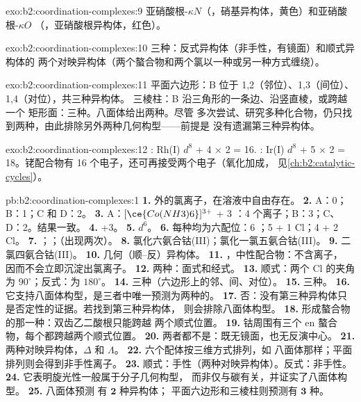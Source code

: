 \begin{solution}{exo:b2:coordination-complexes:9}
亚硝酸根-$\kappa N$（，硝基异构体，黄色）和亚硝酸根-$\kappa O$
（，亚硝酸根异构体，红色）。
\end{solution}

\begin{solution}{exo:b2:coordination-complexes:10}
三种：反式异构体（非手性，有镜面）和顺式异构体的
两个对映异构体（两个螯合物和两个氯以一种或另一种方式缠绕）。
\end{solution}

\begin{solution}{exo:b2:coordination-complexes:11}
平面六边形：B 位于 1,2（邻位）、1,3（间位）、1,4（对位），共三种异构体。
三棱柱：B 沿三角形的一条边、沿竖直棱，或跨越一个
矩形面：三种。八面体给出两种。尽管
多次尝试、研究多种化合物，仍只找到两种，由此排除另外两种几何构型——前提是
没有遗漏第三种异构体。
\end{solution}

\begin{solution}{exo:b2:coordination-complexes:12}
: Rh(I) $d^8$ + 4 × 2 = 16. : Ir(I) $d^8$ + 5 × 2 =
18。铑配合物有 16 个电子，还可再接受两个电子（氧化加成，
见\cref{ch:b2:catalytic-cycles}）。
\end{solution}

\begin{solution}{pb:b2:coordination-complexes:1}
\textbf{1.} 外的氯离子，在溶液中自由存在。
\textbf{2.} A：0；B：1；C 和 D：2。
\textbf{3.} A：$[\ce{Co(NH3)6}]^{3+}$ + 3 ：4 个离子；B：3；C、D：2。结果一致。
\textbf{4.} +3。
\textbf{5.} $d^6$。
\textbf{6.} 每种均为六配位：6 ；5  + 1 Cl；4  + 2 Cl。
\textbf{7.} ；；（出现两次）。
\textbf{8.} 氯化六氨合钴(III)；氯化一氯五氨合钴(III)。
\textbf{9.} 二氯四氨合钴(III)。
\textbf{10.} 几何（顺–反）异构体。
\textbf{11.} \ce{[CoCl3(NH3)3]}，中性配合物：不含离子，
因而不会立即沉淀出氯离子。
\textbf{12.} 两种：面式和经式。
\textbf{13.} 顺式：两个 Cl 的夹角为 $90^\circ$；反式：为 $180^\circ$。
\textbf{14.} 三种（六边形上的邻、间、对位）。
\textbf{15.} 三种。
\textbf{16.} 它支持八面体构型，是三者中唯一预测为两种的。
\textbf{17.} 否：没有第三种异构体只是否定性的证据。若找到第三种异构体，
则会排除八面体构型。
\textbf{18.} 形成螯合物的那一种：双齿乙二酸根只能跨越
两个顺式位置。
\textbf{19.} 钴周围有三个 en 螯合物，每个都跨越两个顺式位置。
\textbf{20.} 两者都不是：既无镜面，也无反演中心。
\textbf{21.} 两种对映异构体，$\Delta$ 和 $\Lambda$。
\textbf{22.} 六个配体按三维方式排列，如
八面体那样；平面排列则会得到非手性离子。
\textbf{23.} 顺式：手性（两种对映异构体）。反式：非手性。
\textbf{24.} 它表明旋光性一般属于分子几何构型，
而非仅与碳有关，并证实了八面体构型。
\textbf{25.} 八面体预测 \ce{[CoCl2(NH3)4]+} 有 $\boldsymbol{2}$ 种异构体；
平面六边形和三棱柱则预测有 $\boldsymbol{3}$ 种。
\end{solution}
